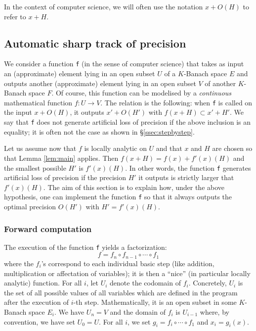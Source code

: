 \documentclass{lms}
\begin{document}
In the context of computer science, we will often use the notation $x + 
O(H)$ to refer to $x + H$.

\subsection{Automatic sharp track of precision}

We consider a function {\tt f} (in the sense of computer 
science) that takes as input an (approximate) element lying in an open 
subset $U$ of a $K$-Banach space $E$ and outputs another (approximate) 
element lying in an open subset $V$ of another $K$-Banach space $F$. Of 
course, this function can be modelised by a \emph{continuous} 
mathematical function $f : U \to V$. The relation is the following: when 
{\tt f} is called on the input $x + O(H)$, it outputs $x' + O(H')$ with 
$f(x+H) \subset x' + H'$. We say that {\tt f} does not generate 
artificial loss of precision if the above inclusion is an equality; it is 
often not the case as shown in \S \ref{ssec:stepbystep}.

Let us assume now that $f$ is locally analytic on $U$ and that $x$ and 
$H$ are chosen so that Lemma \ref{lem:main} applies. Then $f(x+H) = f(x) 
+ f'(x)(H)$ and the smallest possible $H'$ is $f'(x)(H)$. In other 
words, the function {\tt f} generates artificial loss of precision if 
the precision $H'$ it outputs is strictly larger that $f'(x)(H)$.
The aim of this section is to explain how, under the above hypothesis, 
one can implement the function {\tt f} so that it always outputs the
optimal precision $O(H')$ with $H' = f'(x)(H)$.

\subsubsection*{Forward computation}

The execution of the function {\tt f} yields a factorization:
$$f = f_n \circ f_{n-1} \circ \cdots \circ f_1$$
where the $f_i$'s correspond to each individual basic step (like 
addition, multiplication or affectation of variables); it is then a
``nice'' (in particular locally analytic) function. For all 
$i$, let $U_i$ denote the codomain of $f_i$. Concretely, $U_i$ is the 
set of all possible values of all variables which are defined in the 
program after the execution of $i$-th step. Mathematically, it is an 
open subset in some $K$-Banach space $E_i$. We have $U_n = V$ and the 
domain of $f_i$ is $U_{i-1}$ where, by convention, we have set $U_0 = 
U$.
For all $i$, we set $g_i = f_i \circ \cdots \circ f_1$ and $x_i = 
g_i(x)$. 
\end{document}

